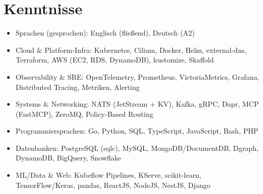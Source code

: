 \documentclass[10pt,a4paper]{resume}
\begin{document}
\section{Kenntnisse}

\begin{itemize}[leftmargin=1.4em,nosep,topsep=2pt]
  \item Sprachen (gesprochen): Englisch (fließend), Deutsch (A2)
  \item Cloud \& Platform-Infra: Kubernetes, Cilium, Docker, Helm, external-dns, Terraform, AWS (EC2, RDS, DynamoDB), kustomize, Skaffold
  \item Observability \& SRE: OpenTelemetry, Prometheus, VictoriaMetrics, Grafana, Distributed Tracing, Metriken, Alerting
  \item Systems \& Networking: NATS (JetStream + KV), Kafka, gRPC, Dapr, MCP (FastMCP), ZeroMQ, Policy-Based Routing
  \item Programmiersprachen: Go, Python, SQL, TypeScript, JavaScript, Bash, PHP
  \item Datenbanken: PostgreSQL (sqlc), MySQL, MongoDB/DocumentDB, Dgraph, DynamoDB, BigQuery, Snowflake
  \item ML/Data \& Web: Kubeflow Pipelines, KServe, scikit-learn, TensorFlow/Keras, pandas, ReactJS, NodeJS, NestJS, Django
\end{itemize}
\end{document}
